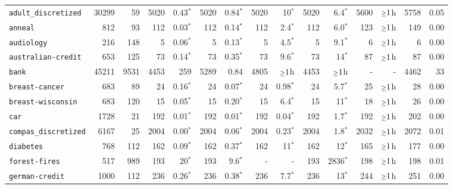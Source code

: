 \begin{tabular}{lccrrrrrrrrrrrr}
\texttt{adult\_discretized} & \multicolumn{1}{r}{30299} & \multicolumn{1}{r}{59}  & 5020 & 0.43$^*$ & 5020 & 0.84$^*$ & 5020 & 10$^*$ & 5020 & 6.4$^*$ & 5600 & $\mathsmaller{\geq}1$h & 5758 & 0.05\\
\texttt{anneal} & \multicolumn{1}{r}{812} & \multicolumn{1}{r}{93}  & 112 & 0.03$^*$ & 112 & 0.14$^*$ & 112 & 2.4$^*$ & 112 & 6.0$^*$ & 123 & $\mathsmaller{\geq}1$h & 149 & 0.00\\
\texttt{audiology} & \multicolumn{1}{r}{216} & \multicolumn{1}{r}{148}  & 5 & 0.06$^*$ & 5 & 0.13$^*$ & 5 & 4.5$^*$ & 5 & 9.1$^*$ & 6 & $\mathsmaller{\geq}1$h & 6 & 0.00\\
\texttt{australian-credit} & \multicolumn{1}{r}{653} & \multicolumn{1}{r}{125}  & 73 & 0.14$^*$ & 73 & 0.35$^*$ & 73 & 9.6$^*$ & 73 & 14$^*$ & 87 & $\mathsmaller{\geq}1$h & 87 & 0.00\\
\texttt{bank} & \multicolumn{1}{r}{45211} & \multicolumn{1}{r}{9531}  & 4453 & 259 & 5289 & 0.84 & 4805 & $\mathsmaller{\geq}1$h & 4453 & $\mathsmaller{\geq}1$h & - & - & 4462 & 33\\
\texttt{breast-cancer} & \multicolumn{1}{r}{683} & \multicolumn{1}{r}{89}  & 24 & 0.16$^*$ & 24 & 0.07$^*$ & 24 & 0.98$^*$ & 24 & 5.7$^*$ & 25 & $\mathsmaller{\geq}1$h & 28 & 0.00\\
\texttt{breast-wisconsin} & \multicolumn{1}{r}{683} & \multicolumn{1}{r}{120}  & 15 & 0.05$^*$ & 15 & 0.20$^*$ & 15 & 6.4$^*$ & 15 & 11$^*$ & 18 & $\mathsmaller{\geq}1$h & 26 & 0.00\\
\texttt{car} & \multicolumn{1}{r}{1728} & \multicolumn{1}{r}{21}  & 192 & 0.01$^*$ & 192 & 0.01$^*$ & 192 & 0.04$^*$ & 192 & 1.7$^*$ & 192 & $\mathsmaller{\geq}1$h & 202 & 0.00\\
\texttt{compas\_discretized} & \multicolumn{1}{r}{6167} & \multicolumn{1}{r}{25}  & 2004 & 0.00$^*$ & 2004 & 0.06$^*$ & 2004 & 0.23$^*$ & 2004 & 1.8$^*$ & 2032 & $\mathsmaller{\geq}1$h & 2072 & 0.01\\
\texttt{diabetes} & \multicolumn{1}{r}{768} & \multicolumn{1}{r}{112}  & 162 & 0.09$^*$ & 162 & 0.37$^*$ & 162 & 11$^*$ & 162 & 12$^*$ & 165 & $\mathsmaller{\geq}1$h & 177 & 0.00\\
\texttt{forest-fires} & \multicolumn{1}{r}{517} & \multicolumn{1}{r}{989}  & 193 & 20$^*$ & 193 & 9.6$^*$ & - & - & 193 & 2836$^*$ & 198 & $\mathsmaller{\geq}1$h & 198 & 0.01\\
\texttt{german-credit} & \multicolumn{1}{r}{1000} & \multicolumn{1}{r}{112}  & 236 & 0.26$^*$ & 236 & 0.38$^*$ & 236 & 7.7$^*$ & 236 & 13$^*$ & 244 & $\mathsmaller{\geq}1$h & 251 & 0.00\\

\end{tabular}
